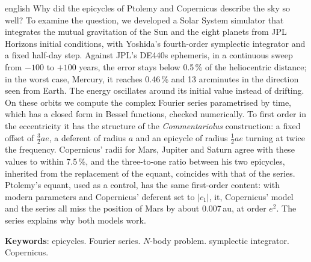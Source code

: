 \begin{resumo}[Abstract]
\begin{otherlanguage*}{english}
Why did the epicycles of Ptolemy and Copernicus describe the sky so well? To examine the question, we developed a Solar System simulator that integrates the mutual gravitation of the Sun and the eight planets from JPL Horizons initial conditions, with Yoshida's fourth-order symplectic integrator and a fixed half-day step. Against JPL's DE440s ephemeris, in a continuous sweep from $-100$ to $+100$ years, the error stays below 0.5\,\% of the heliocentric distance; in the worst case, Mercury, it reaches 0.46\,\% and 13 arcminutes in the direction seen from Earth. The energy oscillates around its initial value instead of drifting. On these orbits we compute the complex Fourier series parametrised by time, which has a closed form in Bessel functions, checked numerically. To first order in the eccentricity it has the structure of the \emph{Commentariolus} construction: a fixed offset of $\tfrac{3}{2}ae$, a deferent of radius $a$ and an epicycle of radius $\tfrac{1}{2}ae$ turning at twice the frequency. Copernicus' radii for Mars, Jupiter and Saturn agree with these values to within 7.5\,\%, and the three-to-one ratio between his two epicycles, inherited from the replacement of the equant, coincides with that of the series. Ptolemy's equant, used as a control, has the same first-order content: with modern parameters and Copernicus' deferent set to $|c_1|$, it, Copernicus' model and the series all miss the position of Mars by about 0.007\,au, at order $e^2$. The series explains why both models work.

\vspace{\onelineskip}
\noindent
\textbf{Keywords}: epicycles. Fourier series. $N$-body problem. symplectic integrator. Copernicus.
\end{otherlanguage*}
\end{resumo}
